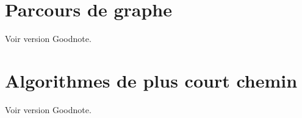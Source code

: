 \chapter{Parcours de graphe} %

Voir version Goodnote. 

\chapter{Algorithmes de plus court chemin} %

Voir version Goodnote.

